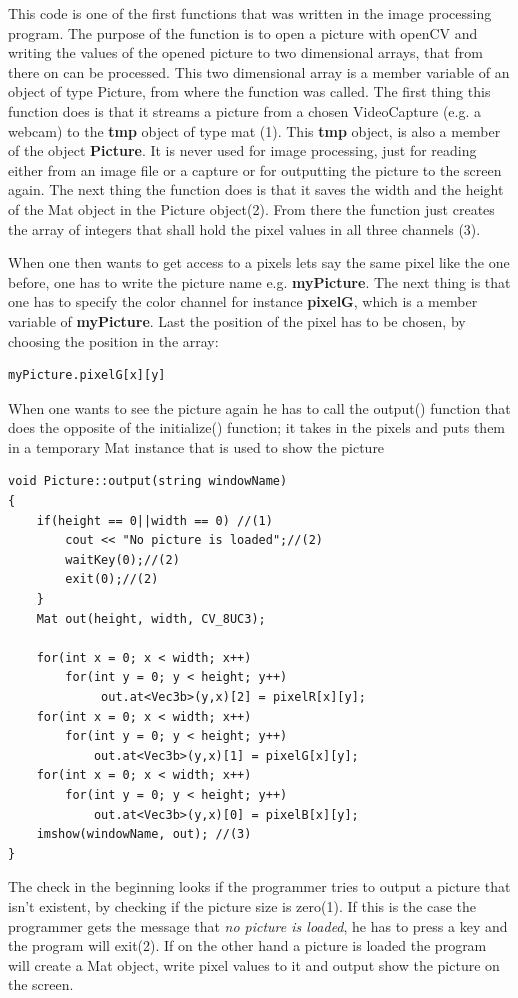This code is one of the first functions that was written in the image processing program. The purpose of the function is to open a picture with openCV and writing the values of the opened picture to two dimensional arrays, that from there on can be processed. This two dimensional array is a member variable of an object of type Picture, from where the function was called. 
The first thing this function does is that it streams a picture from a chosen VideoCapture (e.g. a webcam) to the \textbf{tmp} object of type mat (1). This \textbf{tmp} object, is also a member of the object \textbf{Picture}. It is never used for image processing, just for reading either from an image file or a capture or for outputting the picture to the screen again. The next thing the function does is that it saves the width and the height of the Mat object in the Picture object(2). From there the function just creates the array of integers that shall hold the pixel values in all three channels (3). 

When one then wants to get access to a pixels lets say the same pixel like the one before, one has to write the picture name e.g. \textbf{myPicture}. The next thing is that one has to specify the color channel for instance \textbf{pixelG}, which is a member variable of \textbf{myPicture}. Last the position of the pixel has to be chosen, by choosing the position in the array:

\begin{lstlisting}
myPicture.pixelG[x][y]
\end{lstlisting}

When one wants to see the picture again he has to call the output() function that does the opposite of the initialize() function; it takes in the pixels and puts them in a temporary Mat instance that is used to show the picture

\begin{lstlisting}
void Picture::output(string windowName)
{
	if(height == 0||width == 0) //(1)
		cout << "No picture is loaded";//(2)
		waitKey(0);//(2)
		exit(0);//(2)
	}
	Mat out(height, width, CV_8UC3);

	for(int x = 0; x < width; x++)
		for(int y = 0; y < height; y++)
			 out.at<Vec3b>(y,x)[2] = pixelR[x][y];
	for(int x = 0; x < width; x++)
		for(int y = 0; y < height; y++)
			out.at<Vec3b>(y,x)[1] = pixelG[x][y];
	for(int x = 0; x < width; x++)
		for(int y = 0; y < height; y++)
			out.at<Vec3b>(y,x)[0] = pixelB[x][y];			
	imshow(windowName, out); //(3)
}
\end{lstlisting}
The check in the beginning looks if the programmer tries to output a picture that isn't existent, by checking if the picture size is zero(1). If this is the case the programmer gets the message that \textit{no picture is loaded}, he has to press a key and the program will exit(2). If on the other hand a picture is loaded the program will create a Mat object, write pixel values to it and output show the picture on the screen. 

